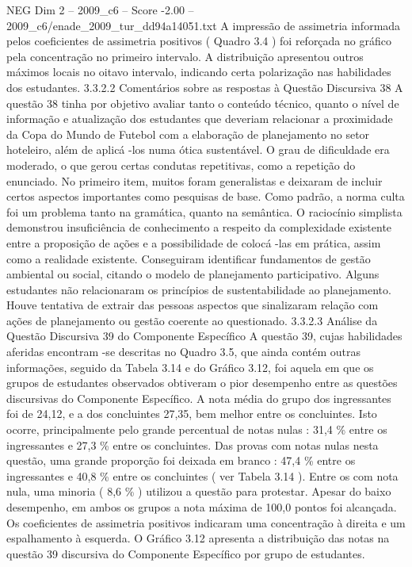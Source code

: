 \begin{textsample}{NEG Dim 2 – 2009\_c6 – Score -2.00 – 2009\_c6/enade\_2009\_tur\_dd94a14051.txt}
A impressão de assimetria informada pelos coeficientes de assimetria positivos ( Quadro 3.4 ) foi reforçada no gráfico pela concentração no primeiro intervalo.
A distribuição apresentou outros máximos locais no oitavo intervalo, indicando certa polarização nas habilidades dos estudantes. 3.3.2.2 Comentários sobre as respostas à Questão Discursiva 38 A questão 38 tinha por objetivo avaliar tanto o conteúdo técnico, quanto o nível de informação e atualização dos estudantes que deveriam relacionar a proximidade da Copa do Mundo de Futebol com a elaboração de planejamento no setor hoteleiro, além de aplicá -los numa ótica sustentável.
O grau de dificuldade era moderado, o que gerou certas condutas repetitivas, como a repetição do enunciado.
No primeiro item, muitos foram generalistas e deixaram de incluir certos aspectos importantes como pesquisas de base.
Como padrão, a norma culta foi um problema tanto na gramática, quanto na semântica.
O raciocínio simplista demonstrou insuficiência de conhecimento a respeito da complexidade existente entre a proposição de ações e a possibilidade de colocá -las em prática, assim como a realidade existente.
Conseguiram identificar fundamentos de gestão ambiental ou social, citando o modelo de planejamento participativo.
Alguns estudantes não relacionaram os princípios de sustentabilidade ao planejamento.
Houve tentativa de extrair das pessoas aspectos que sinalizaram relação com ações de planejamento ou gestão coerente ao questionado. 3.3.2.3 Análise da Questão Discursiva 39 do Componente Específico A questão 39, cujas habilidades aferidas encontram -se descritas no Quadro 3.5, que ainda contém outras informações, seguido da Tabela 3.14 e do Gráfico 3.12, foi aquela em que os grupos de estudantes observados obtiveram o pior desempenho entre as questões discursivas do Componente Específico.
A nota média do grupo dos ingressantes foi de 24,12, e a dos concluintes 27,35, bem melhor entre os concluintes.
Isto ocorre, principalmente pelo grande percentual de notas nulas : 31,4 \% entre os ingressantes e 27,3 \% entre os concluintes.
Das provas com notas nulas nesta questão, uma grande proporção foi deixada em branco : 47,4 \% entre os ingressantes e 40,8 \% entre os concluintes ( ver Tabela 3.14 ).
Entre os com nota nula, uma minoria ( 8,6 \% ) utilizou a questão para protestar.
Apesar do baixo desempenho, em ambos os grupos a nota máxima de 100,0 pontos foi alcançada.
Os coeficientes de assimetria positivos indicaram uma concentração à direita e um espalhamento à esquerda.
O Gráfico 3.12 apresenta a distribuição das notas na questão 39 discursiva do Componente Específico por grupo de estudantes.

\end{textsample}
